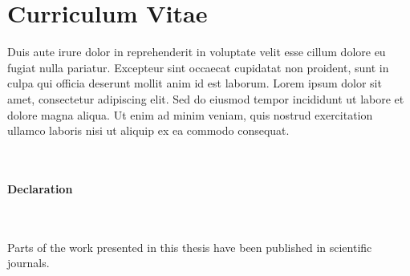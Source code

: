 %
\chapter*{Curriculum Vitae}
\label{c:curriculumVitae}
%
\noindent
Duis aute irure dolor in reprehenderit in voluptate velit esse cillum dolore eu fugiat nulla pariatur.
Excepteur sint occaecat cupidatat non proident, sunt in culpa qui officia deserunt mollit anim id est laborum.
Lorem ipsum dolor sit amet, consectetur adipiscing elit. 
Sed do eiusmod tempor incididunt ut labore et dolore magna aliqua. 
Ut enim ad minim veniam, quis nostrud exercitation ullamco laboris nisi ut aliquip ex ea commodo consequat.
\\ \\ \\
\begin{Large}
\textbf{Declaration}
\end{Large}
\\ \\
Parts of the work presented in this thesis have been published in scientific journals.
%

